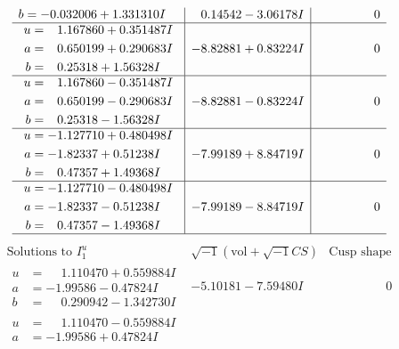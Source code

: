 \documentclass[1p]{elsarticle_modified}
\theoremstyle{definition}
\newcommand{\I}{\sqrt{-1}}
\begin{document}
$$\begin{array}{c|c|c}
\begin{aligned}
b &= -0.032006 + 1.331310 I\end{aligned}
 & \phantom{-}0.14542 - 3.06178 I & \phantom{-0.000000 } 0 \\ \hline\begin{aligned}
u &= \phantom{-}1.167860 + 0.351487 I \\
a &= \phantom{-}0.650199 + 0.290683 I \\
b &= \phantom{-}0.25318 + 1.56328 I\end{aligned}
 & -8.82881 + 0.83224 I & \phantom{-0.000000 } 0 \\ \hline\begin{aligned}
u &= \phantom{-}1.167860 - 0.351487 I \\
a &= \phantom{-}0.650199 - 0.290683 I \\
b &= \phantom{-}0.25318 - 1.56328 I\end{aligned}
 & -8.82881 - 0.83224 I & \phantom{-0.000000 } 0 \\ \hline\begin{aligned}
u &= -1.127710 + 0.480498 I \\
a &= -1.82337 + 0.51238 I \\
b &= \phantom{-}0.47357 + 1.49368 I\end{aligned}
 & -7.99189 + 8.84719 I & \phantom{-0.000000 } 0 \\ \hline\begin{aligned}
u &= -1.127710 - 0.480498 I \\
a &= -1.82337 - 0.51238 I \\
b &= \phantom{-}0.47357 - 1.49368 I\end{aligned}
 & -7.99189 - 8.84719 I & \phantom{-0.000000 } 0\\
 \hline 
 \end{array}$$\newpage$$\begin{array}{c|c|c}  
\text{Solutions to }I^u_{1}& \I (\text{vol} + \sqrt{-1}CS) & \text{Cusp shape}\\
 \hline 
\begin{aligned}
u &= \phantom{-}1.110470 + 0.559884 I \\
a &= -1.99586 - 0.47824 I \\
b &= \phantom{-}0.290942 - 1.342730 I\end{aligned}
 & -5.10181 - 7.59480 I & \phantom{-0.000000 } 0 \\ \hline\begin{aligned}
u &= \phantom{-}1.110470 - 0.559884 I \\
a &= -1.99586 + 0.47824 I \\

\end{aligned}
\end{array}$$
\end{document}
